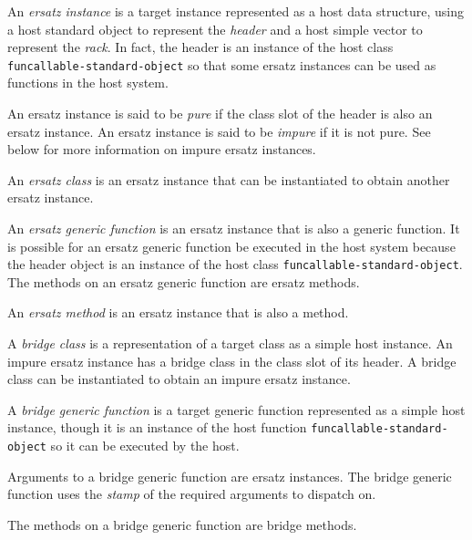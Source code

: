 \begin{definition}
An \emph{ersatz instance} is a target instance represented as a host
data structure, using a host standard object to represent the
\emph{header} and a host simple vector to represent the \emph{rack}.
In fact, the header is an instance of the host class
\texttt{funcallable-standard-object} so that some ersatz instances can
be used as functions in the host system.
\end{definition}

\begin{definition}
An ersatz instance is said to be \emph{pure} if the class slot of the
header is also an ersatz instance.  An ersatz instance is said to be
\emph{impure} if it is not pure.  See below for more information on
impure ersatz instances.
\end{definition}

\begin{definition}
An \emph{ersatz class} is an ersatz instance that can be instantiated
to obtain another ersatz instance.
\end{definition}

\begin{definition}
An \emph{ersatz generic function} is an ersatz instance that is also a
generic function.  It is possible for an ersatz generic function be
executed in the host system because the header object is an instance
of the host class \texttt{funcallable-standard-object}.  The methods
on an ersatz generic function are ersatz methods.
\end{definition}

\begin{definition}
An \emph{ersatz method} is an ersatz instance that is also a method.
\end{definition}

\begin{definition}
A \emph{bridge class} is a representation of a target class as a
simple host instance.  An impure ersatz instance has a bridge class in
the class slot of its header.  A bridge class can be instantiated to
obtain an impure ersatz instance.
\end{definition}

\begin{definition}
A \emph{bridge generic function} is a target generic function
represented as a simple host instance, though it is an instance of the
host function \texttt{funcallable-standard-object} so it can be
executed by the host.

Arguments to a bridge generic function are ersatz instances.  The
bridge generic function uses the 
\emph{stamp}
 of
the required arguments to dispatch on. 

The methods on a bridge generic function are bridge methods.
\end{definition}

